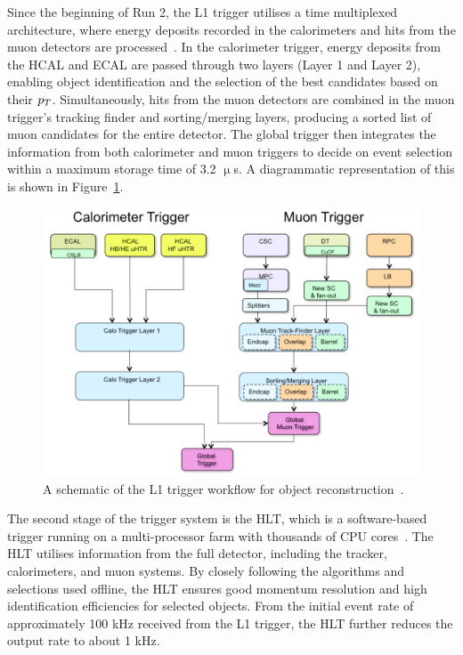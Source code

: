 Since the beginning of Run 2, the \ac{L1} trigger utilises a time multiplexed architecture, where energy deposits recorded in the calorimeters and hits from the muon detectors are processed~\cite{Tapper:2013yva}. 
In the calorimeter trigger, energy deposits from the \ac{HCAL} and \ac{ECAL} are passed through two layers (Layer 1 and Layer 2), enabling object identification and the selection of the best candidates based on their $p_{T}$. 
Simultaneously, hits from the muon detectors are combined in the muon trigger's tracking finder and sorting/merging layers, producing a sorted list of muon candidates for the entire detector. 
The global trigger then integrates the information from both calorimeter and muon triggers to decide on event selection within a maximum storage time of 3.2 $\upmu$s.
A diagrammatic representation of this is shown in Figure~\ref{fig:trigger}. \\

\begin{figure}[!hbtp]
    \centering
    \includegraphics[width=\textwidth]{Figures/trigger.png}
    \caption[Diagram of the CMS L1 trigger workflow.]{A schematic of the L1 trigger workflow for object reconstruction~\cite{Tapper:2013yva}.}
    \label{fig:trigger}
\end{figure}

The second stage of the trigger system is the \ac{HLT}, which is a software-based trigger running on a multi-processor farm with thousands of CPU cores~\cite{CMS_trigger,CMSTrigger:2005yhe}. 
The \ac{HLT} utilises information from the full detector, including the tracker, calorimeters, and muon systems. 
By closely following the algorithms and selections used offline, the \ac{HLT} ensures good momentum resolution and high identification efficiencies for selected objects. 
From the initial event rate of approximately 100 kHz received from the \ac{L1} trigger, the \ac{HLT} further reduces the output rate to about 1 kHz. \\

